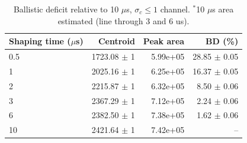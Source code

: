 \begin{table}[htbp]
\centering
\caption{Ballistic deficit relative to 10 $\mu$s, $\sigma_c \le 1$ channel. $^*$10 $\mu$s area estimated (line through 3 and 6 us).}
\label{tab:bd}
\begin{tabular}{lrrr}
\toprule
Shaping time ($\mu$s) & Centroid & Peak area & BD (\%) \\
\midrule
0.5 & 1723.08 $\pm$ 1 & 5.99e+05 & 28.85 $\pm$ 0.05 \\
1 & 2025.16 $\pm$ 1 & 6.25e+05 & 16.37 $\pm$ 0.05 \\
2 & 2215.87 $\pm$ 1 & 6.32e+05 & 8.50 $\pm$ 0.06 \\
3 & 2367.29 $\pm$ 1 & 7.12e+05 & 2.24 $\pm$ 0.06 \\
6 & 2382.50 $\pm$ 1 & 7.38e+05 & 1.62 $\pm$ 0.06 \\
10 & 2421.64 $\pm$ 1 & 7.42e+05 & -- \\
\bottomrule
\end{tabular}
\end{table}
